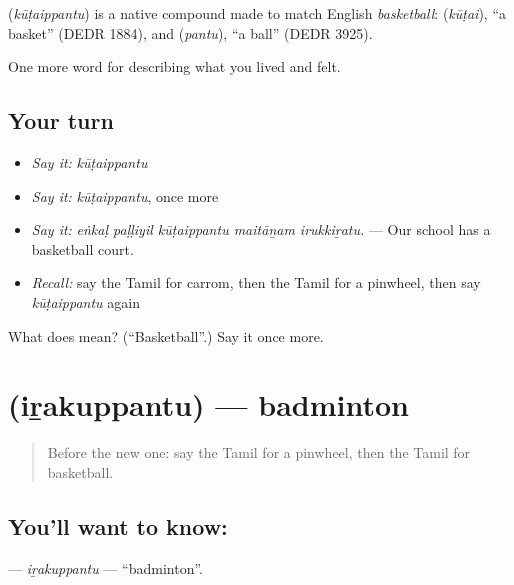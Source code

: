 \begin{cousinweb}
\textbf{} (\emph{kūṭaippantu}) is a native compound made to match English \emph{basketball}:  (\emph{kūṭai}), \textquotedblleft{}a basket\textquotedblright{} (DEDR 1884), and  (\emph{pantu}), \textquotedblleft{}a ball\textquotedblright{} (DEDR 3925).
\end{cousinweb}

\begin{grammarlens}[title={What you've built}]
One more word for describing what you lived and felt.
\end{grammarlens}

\subsection*{Your turn}
\begin{itemize}
\raggedright
  \item \emph{Say it:} \emph{kūṭaippantu}
  \item \emph{Say it:} \emph{kūṭaippantu}, once more
  \item \emph{Say it:} \emph{eṅkaḷ paḷḷiyil kūṭaippantu maitāṉam irukkiṟatu.} — Our school has a basketball court.
  \item \emph{Recall:} say the Tamil for carrom, then the Tamil for a pinwheel, then say \emph{kūṭaippantu} again
\end{itemize}

\begin{tcolorbox}[breakable,colback=teal!4,colframe=teal!35!black,title={Before you move on}]
What does  mean? (\textquotedblleft{}Basketball\textquotedblright{}.) Say it once more.
\end{tcolorbox}
\section[\texorpdfstring{\ta{இறகுப்பந்து} (iṟakuppantu)}{இறகுப்பந்து (iṟakuppantu)}]{ (iṟakuppantu) — badminton}

\label{lesson:TA-C531-irakuppantu}



\begin{quote}
Before the new one: say the Tamil for a pinwheel, then the Tamil for basketball.
\end{quote}

\subsection*{You'll want to know: }
\textbf{} — \emph{iṟakuppantu} — \textquotedblleft{}badminton\textquotedblright{}.

